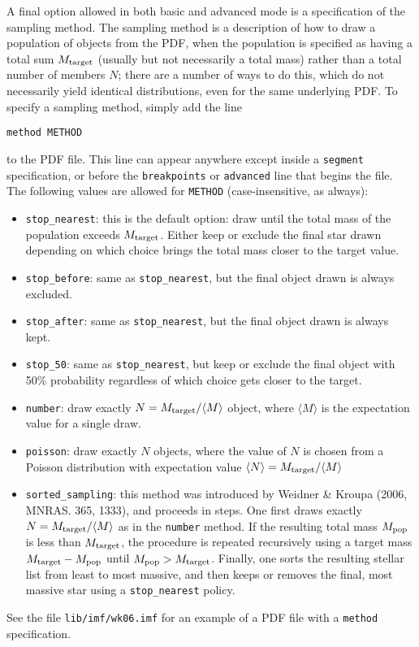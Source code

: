 \documentclass[12pt]{article}
\begin{document}
A final option allowed in both basic and advanced mode is a specification of the sampling method. The sampling method is a description of how to draw a population of objects from the PDF, when the population is specified as having a total sum $M_{\rm target}$ (usually but not necessarily a total mass) rather than a total number of members $N$; there are a number of ways to do this, which do not necessarily yield identical distributions, even for the same underlying PDF. To specify a sampling method, simply add the line
\begin{verbatim}
method METHOD
\end{verbatim}
to the PDF file. This line can appear anywhere except inside a \verb=segment= specification, or before the \verb=breakpoints= or \verb=advanced= line that begins the file. The following values are allowed for \verb=METHOD= (case-insensitive, as always):
\begin{itemize}
\item \texttt{stop\_nearest}: this is the default option: draw until the total mass of the population exceeds $M_{\rm target}$. Either keep or exclude the final star drawn depending on which choice brings the total mass closer to the target value.
\item \texttt{stop\_before}: same as \texttt{stop\_nearest}, but the final object drawn is always excluded.
\item \texttt{stop\_after}: same as \texttt{stop\_nearest}, but the final object drawn is always kept.
\item \texttt{stop\_50}: same as \texttt{stop\_nearest}, but keep or exclude the final object with 50\% probability regardless of which choice gets closer to the target.
\item \texttt{number}: draw exactly $N = M_{\rm target}/\langle M\rangle$ object, where $\langle M\rangle$ is the expectation value for a single draw.
\item \texttt{poisson}: draw exactly $N$ objects, where the value of $N$ is chosen from a Poisson distribution with expectation value $\langle N \rangle = M_{\rm target}/\langle M\rangle$
\item \texttt{sorted\_sampling}: this method was introduced by Weidner \& Kroupa (2006, MNRAS. 365, 1333), and proceeds in steps. One first draws exactly $N= M_{\rm target}/\langle M\rangle$ as in the \texttt{number} method. If the resulting total mass $M_{\rm pop}$ is less than $M_{\rm target}$, the procedure is repeated recursively using a target mass $M_{\rm target} - M_{\rm pop}$ until $M_{\rm pop} > M_{\rm target}$. Finally, one sorts the resulting stellar list from least to most massive, and then keeps or removes the final, most massive star using a \texttt{stop\_nearest} policy. 
\end{itemize}
See the file \texttt{lib/imf/wk06.imf} for an example of a PDF file with a \verb=method= specification.
\end{document}
